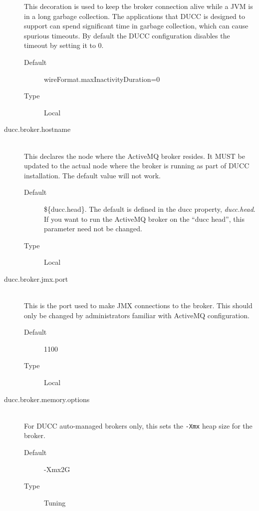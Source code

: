 \begin{description}
         This decoration is used to keep the broker connection alive while a JVM is in a
         long garbage collection. The applications that DUCC is designed to support can
         spend significant time in garbage collection, which can cause spurious timeouts. By
         default the DUCC configuration disables the timeout by setting it to 0.       

         \begin{description}
           \item[Default] wireFormat.maxInactivityDuration=0 
           \item[Type] Local 
         \end{description}

       \item[ducc.broker.hostname] \hfill \\
         This declares the node where the ActiveMQ broker resides. It MUST be updated to 
         the actual node where the broker is running as part of DUCC installation. The default value 
         will not work.          
         \begin{description}               
           \item[Default] \$\{ducc.head\}.  The default is defined in the ducc property, {\em ducc.head}.
             If you want to run the ActiveMQ broker on the ``ducc head'', this parameter need not
             be changed.
           \item[Type] Local 
         \end{description}

       \item[ducc.broker.jmx.port] \hfill \\
         This is the port used to make JMX connections to the broker.  This should only
         be changed by administrators familiar with ActiveMQ configuration.         
         \begin{description}         
           \item[Default] 1100                      
           \item[Type] Local 
         \end{description}

       \item[ducc.broker.memory.options] \hfill \\
         For DUCC auto-managed brokers only, this sets the {\tt -Xmx} heap size for the broker.
         \begin{description}
           \item[Default] -Xmx2G
           \item[Type] Tuning
         \end{description} 
           


\end{description}
